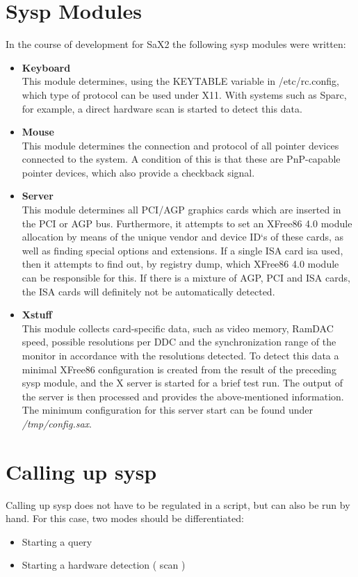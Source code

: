 \section{Sysp Modules}
In the course of development for SaX2 the following sysp modules were written:
\begin{itemize}
\item \textbf{Keyboard}\\
      This module determines, using the KEYTABLE variable in 
      /etc/rc.config, which type of protocol can be used under X11. With
      systems such as Sparc, for example, a direct hardware scan is started to
      detect this data. 
\item \textbf{Mouse}\\
      This module determines the connection and protocol of all pointer
      devices connected to the system. A condition of this is that these are
      PnP-capable pointer devices, which also provide a checkback signal.
\item \textbf{Server}\\
      This module determines all PCI/AGP graphics cards which are inserted in
      the PCI or AGP bus. Furthermore, it attempts to set an XFree86 4.0
      module allocation by means of the unique vendor and device ID`s of these
      cards, as well as finding special options and extensions. If a single
      ISA card isa used, then it attempts to find out, by registry dump, which
      XFree86 4.0 module can be responsible for this. If there is a mixture of
      AGP, PCI and ISA cards, the ISA cards will definitely not be
      automatically detected.
\item \textbf{Xstuff}\\
      This module collects card-specific data, such as video memory, RamDAC
      speed, possible resolutions per DDC and the synchronization range of the
      monitor in accordance with the resolutions detected. To detect this data
      a minimal XFree86 configuration is created from the result of the
      preceding sysp module, and the X server is started for a brief test
      run. The output of the server is then processed and provides the
      above-mentioned information. The minimum configuration for this server
      start can be found under \textit{/tmp/config.sax}.
\end{itemize}


\section{Calling up sysp}
Calling up sysp does not have to be regulated in a script, but can also be run
by hand. For this case, two modes should be differentiated:
\begin{itemize}
\item Starting a query
\item Starting a hardware detection ( scan )
\end{itemize}
